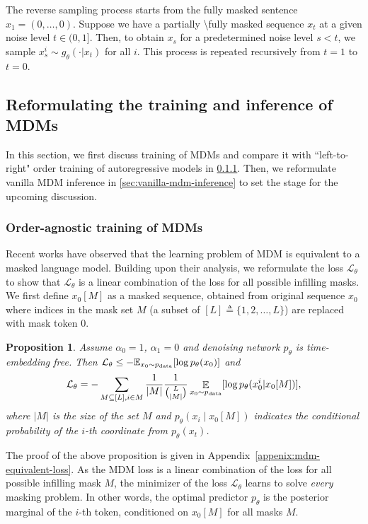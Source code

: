 \documentclass{article}
\newcommand{\mask}{0}
\theoremstyle{plain}
\newtheorem{proposition}[theorem]{Proposition}
\theoremstyle{definition}
\theoremstyle{remark}
\newcounter{theo}
\newcommand{\loss}{\mathcal L}
\begin{document}
The reverse sampling process starts from the fully masked sentence $x_1 = (\mask,\ldots,\mask)$. Suppose we have a partially \textbackslash fully masked sequence \(x_t\) at a given noise level \(t \in (0,1]\). Then, to obtain $x_s$ for a predetermined noise level \(s < t\), we sample $x_s^i \sim g_\theta(\cdot | x_t)$ for all $i$. This process is repeated recursively from \(t=1\) to \(t=0\). 


\subsection{Reformulating the training and inference of MDMs} \label{sec:agnostic_learner}

In this section, we first discuss training of MDMs and compare it with ``left-to-right" order training of autoregressive models in \cref{sec:vanilla-mdm-training}. Then, we reformulate vanilla MDM inference in \cref{sec:vanilla-mdm-inference} to set the stage for the upcoming discussion.

\subsubsection{Order-agnostic training of MDMs}
\label{sec:vanilla-mdm-training}

Recent works \cite{zheng2024maskeddiffusionmodelssecretly,ou2024absorbing} have observed that the learning problem of MDM is equivalent to a masked language model. Building upon their analysis, we reformulate the loss $\mathcal{L}_\theta$ to show that $\loss_{\theta}$ is a linear combination of the loss for all possible infilling masks. We first define \(x_0[M]\) as a masked sequence, obtained from original sequence $x_0$ where indices in the mask set $M$ (a subset of $[L]\triangleq\{1,2,\ldots,L\}$) are replaced with mask token $0$.

\begin{proposition} \label{prop:mdm_loss}
Assume $\alpha_0=1$, $\alpha_1 =0$ and denoising network $p_\theta$ is time-embedding free.
Then $ \mathcal{L}_\theta \le -\mathbb{E}_{x_0 \sim p_{\rm data}}[\log p_\theta(x_0)]$ and
\begin{equation} \label{eqn:mdm_loss}
\mathcal{L}_\theta = -\sum_{ M\subseteq [L],i \in M} \frac{1}{| M |} \frac{1}{\binom{L}{|M|}} \displaystyle \mathop{\mathbb{E}}_{x_0 \sim p_{\rm data}} [ \log p_\theta(x^i_0 | x_0[M]) ],
\end{equation}
where $|M|$ is the size of the set $M$ 
and \(p_\theta(x_i \mid x_0[M])\) indicates the conditional probability of the \(i\)-th coordinate from \(p_\theta(x_t)\).
\end{proposition}
The proof of the above proposition is given in Appendix~\ref{appenix:mdm-equivalent-loss}. As the MDM loss is a linear combination of the loss for all possible infilling mask $M$, the minimizer of the loss $\loss_{\theta}$ learns to solve \emph{every} masking problem. In other words, the optimal predictor $p_\theta$ is the posterior marginal of the $i$-th token, conditioned on $x_0[M]$ for all masks $M$. 
\end{document}
